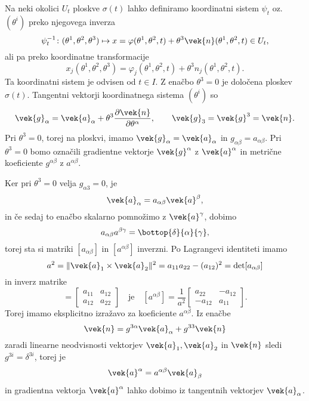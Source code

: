 Na neki okolici $U_t$ ploskve $\sigma(t)$ lahko definiramo koordinatni sistem $\psi_t$ oz.~$(\theta^i)$
preko njegovega inverza
\[
	\psi_t^{-1}\colon(\theta^1,\theta^2,\theta^3)\mapsto x=\varphi(\theta^1,\theta^2,t)+
	\theta^3\vek{n}(\theta^1,\theta^2,t)\in U_t,
\]
ali pa preko koordinatne transformacije
\[
	x_j(\theta^1,\theta^2,\theta^3)=\varphi_j(\theta^1,\theta^2,t)+\theta^3 n_j(\theta^1,\theta^2,t).
\]
Ta koordinatni sistem je odvisen od $t\in I$.
Z enačbo $\theta^3=0$ je določena ploskev $\sigma(t)$.
Tangentni vektorji koordinatnega sistema $(\theta^i)$ so
\[
	\vek{g}_{\alpha}=\vek{a}_{\alpha}+\theta^3\frac{\partial\vek{n}}{\partial\theta^{\alpha}},
	\qquad \vek{g}_3=\vek{g}^3=\vek{n}.
\]
Pri $\theta^3=0$, torej na ploskvi, imamo $\vek{g}_{\alpha}=\vek{a}_{\alpha}$ in
$g_{\alpha\beta}=a_{\alpha\beta}$. Pri $\theta^3=0$
bomo označili gradientne vektorje $\vek{g}^{\alpha}$ z $\vek{a}^{\alpha}$
in metrične koeficiente $g^{\alpha\beta}$ z $a^{\alpha\beta}$.

Ker pri $\theta^3=0$ velja $g_{\alpha 3}=0$, je
\[ \vek{a}_{\alpha}=a_{\alpha\beta}\vek{a}^{\beta}, \]
in če sedaj to enačbo skalarno pomnožimo z $\vek{a}^{\gamma}$, dobimo
\[ a_{\alpha\beta}a^{\beta\gamma}=\bottop{\delta}{\alpha}{\gamma}, \]
torej sta si matriki $[a_{\alpha\beta}]$ in $[a^{\alpha\beta}]$ inverzni.
Po Lagrangevi identiteti imamo
\[ a^2=\|\vek{a}_1\times\vek{a}_2\|^2=a_{11}a_{22}-(a_{12})^2=\det[a_{\alpha\beta}] \]
in inverz matrike
\begin{equation*}
	[a_{\alpha\beta}]=\left[\begin{array}{cc}
		a_{11}&a_{12}\\a_{12}&a_{22}
	\end{array}\right] \quad\textrm{je}\quad
	[a^{\alpha\beta}]=\frac{1}{a^2}\left[\begin{array}{rr}
		a_{22}&-a_{12}\\-a_{12}&a_{11}
	\end{array}\right].
\end{equation*}
Torej imamo eksplicitno izražavo za koeficiente $a^{\alpha\beta}$.  Iz enačbe
\[ \vek{n}=g^{3\alpha}\vek{a}_{\alpha}+g^{33}\vek{n} \]
zaradi linearne neodvisnosti vektorjev $\vek{a}_1,\vek{a}_2$ in $\vek{n}$ sledi
$g^{3i}=\delta^{3i}$, torej je
\begin{equation} \label{e:agd}
	\vek{a}^{\alpha}=a^{\alpha\beta}\vek{a}_{\beta}
\end{equation}
in gradientna vektorja $\vek{a}^{\alpha}$ lahko dobimo iz tangentnih vektorjev $\vek{a}_{\alpha}$.

